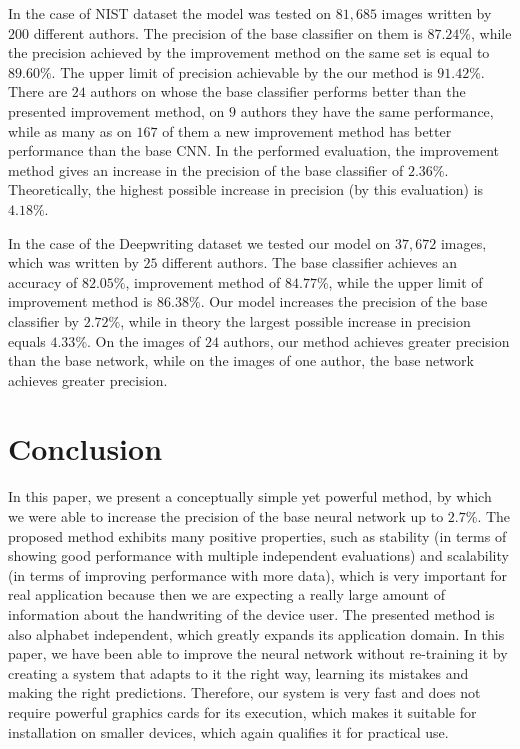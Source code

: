 \documentclass{article}
\begin{document}
In the case of NIST dataset the model was tested on $81,685$ images written by $200$ different authors.
The precision of the base classifier on them is $87.24\%$, while the precision achieved by the improvement method on the same set is equal to $89.60\%$.
The upper limit of precision achievable by the our method is $91.42\%$.
There are $24$ authors on whose the base classifier performs better than the presented improvement method, on $9$ authors they have the same performance,
while as many as on $167$ of them a new improvement method has better performance than the base CNN.
In the performed evaluation, the improvement method gives an increase in the precision of the base classifier of $2.36\%$.
Theoretically, the highest possible increase in precision (by this evaluation) is $4.18\%$.

In the case of the Deepwriting dataset we tested our model on $37,672$ images, which was written by $25$ different authors.
The base classifier achieves an accuracy of $82.05\%$, improvement method of $84.77\%$, while the upper limit of improvement method is $86.38\%$.
Our model increases the precision of the base classifier by $2.72\%$, while in theory the largest possible increase in precision equals $4.33\%$.
On the images of $24$ authors, our method achieves greater precision than the base network, while on the images of one author, the base network achieves greater precision.

\section{Conclusion}

In this paper, we present a conceptually simple yet powerful method, by which we were able to increase the precision of the base neural network up to $2.7\%$.
The proposed method exhibits many positive properties, such as stability
(in terms of showing good performance with multiple independent evaluations) and scalability (in terms of improving performance with more data),
which is very important for real application because then we are expecting a really large amount of information about the handwriting of the device user.
The presented method is also alphabet independent, which greatly expands its application domain.
In this paper, we have been able to improve the neural network without re-training it by creating a system that adapts to it the right way,
learning its mistakes and making the right predictions.
Therefore, our system is very fast and does not require powerful graphics cards for its execution,
which makes it suitable for installation on smaller devices, which again qualifies it for practical use.
\end{document}
